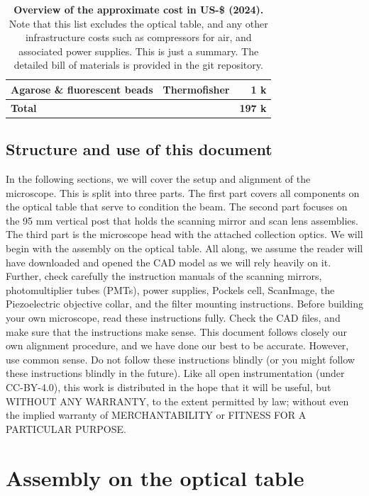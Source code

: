 \documentclass[10pt,letterpaper]{article}
\begin{document}
\begin{table}
\begin{center}
\begin{tabular}{ l c r }
                   Agarose \& fluorescent beads     & Thermofisher &  1 k \\
  \hline
 \textbf{Total}                    & & \textbf{197 k} \\
  \hline
  \end{tabular}
\end{center}
\caption{\textbf{Overview of the approximate cost in US-\$ (2024).} Note that this list excludes the optical table, and any other infrastructure costs such as compressors for air, and associated power supplies. This is just a summary. The detailed bill of materials is provided in the git repository.}\label{tab_costs}
\end{table}

\subsection{Structure and use of this document}
In the following sections, we will cover the setup and alignment of the microscope. This is split into three parts. The first part covers all components on the optical table that serve to condition the beam. The second part focuses on the  95 mm vertical post that holds the scanning mirror and scan lens assemblies. The third part is the microscope head with the attached collection optics. We will begin with the assembly on the optical table. All along, we assume the reader will have downloaded and opened the CAD model as we will rely heavily on it. Further, check carefully the instruction manuals of the scanning mirrors, photomultiplier tubes (PMTs), power supplies, Pockels cell, ScanImage, the Piezoelectric objective collar, and the filter mounting instructions.\newline
Before building your own microscope, read these instructions fully. Check the CAD files, and make sure that the instructions make sense. This document follows closely our own alignment procedure, and we have done our best to be accurate. However, use common sense. Do not follow these instructions blindly (or you might follow these instructions blindly in the future). Like all open instrumentation (under CC-BY-4.0), this work is distributed in the hope that it will be useful, but WITHOUT ANY WARRANTY, to the extent permitted by law; without even the implied warranty of MERCHANTABILITY or FITNESS FOR A PARTICULAR PURPOSE. 

\section{Assembly on the optical table}
%
\end{document}
